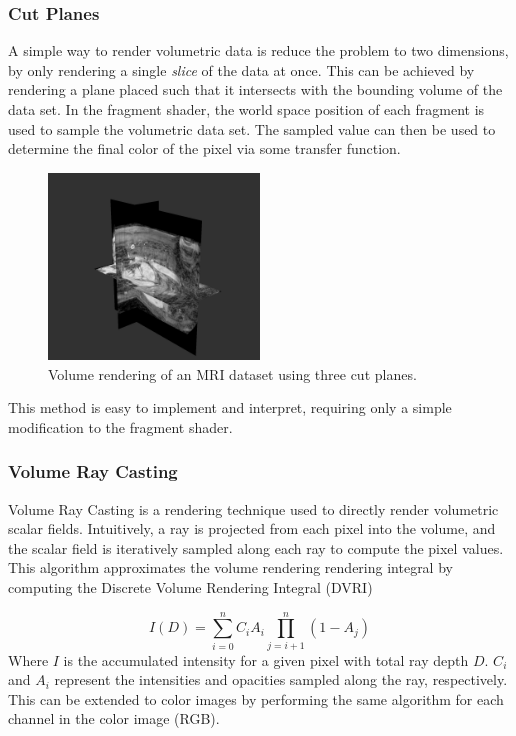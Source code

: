 \documentclass{article}
\begin{document}
\subsubsection{Cut Planes}
A simple way to render volumetric data is reduce the problem to two dimensions, by only rendering a single \textit{slice} of the data
at once. This can be achieved by rendering a plane placed such that it intersects with the bounding volume of the 
data set. In the fragment shader, the world space position of each fragment is used to sample the volumetric data set.
The sampled value can then be used to determine the final color of the pixel via some transfer function.
\begin{figure}[tbh]
    \centering
    \includegraphics[width=0.5\textwidth]{images/CutPlanes.png}
    \caption{Volume rendering of an MRI dataset using three cut planes.}
    \label{fig:cutPlanes}
\end{figure}


This method is easy to implement and interpret, requiring only a simple modification to the fragment shader. 

\subsubsection{Volume Ray Casting}
Volume Ray Casting is a rendering technique used to directly render volumetric scalar fields.
Intuitively, a ray is projected from each pixel into the volume,
and the scalar field is iteratively sampled along each ray to compute the pixel values.
This algorithm approximates the volume rendering rendering integral by computing the Discrete Volume Rendering Integral (DVRI) 

$$ I(D) = \sum_{i=0}^n C_iA_i\prod_{j=i+1}^{n}(1-A_j)$$
Where $I$ is the accumulated intensity for a given pixel with total ray depth $D$.
$C_i$ and $A_i$ represent the intensities and opacities sampled along the ray, respectively. This
can be extended to color images by performing the same algorithm for each channel in the color image (RGB).
\end{document}
